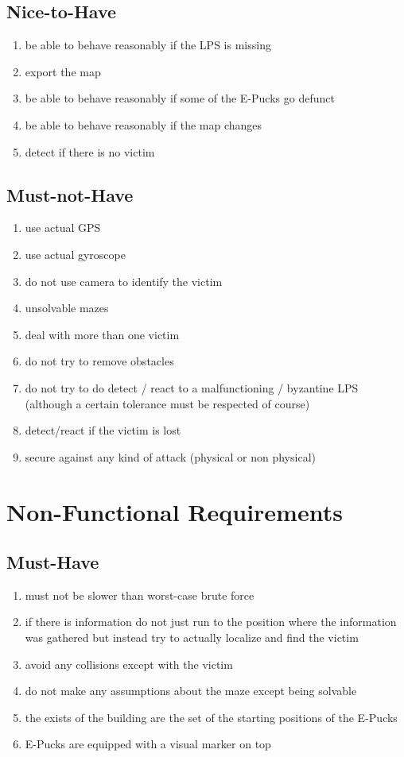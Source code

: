 \documentclass[a4paper,parskip,headheight=38pt]{scrartcl} %
\begin{document}
\subsection{Nice-to-Have}
\begin{enumerate}[label=\nicetohave]
\item be able to behave reasonably if the LPS is missing
\item export the map
\item be able to behave reasonably if some of the E-Pucks go defunct
\item be able to behave reasonably if the map changes
\item detect if there is no victim
\end{enumerate}

\subsection{Must-not-Have}
\begin{enumerate}[label=\mustnothave]
\item use actual GPS
\item use actual gyroscope
\item do not use camera to identify the victim
\item unsolvable mazes
\item deal with more than one victim
\item do not try to remove obstacles
\item do not try to do detect / react to a malfunctioning / byzantine LPS (although a certain tolerance must be respected of course)
\item detect/react if the victim is lost
\item secure against any kind of attack (physical or non physical)
\end{enumerate}

\section{Non-Functional Requirements}
\subsection{Must-Have}
\begin{enumerate}[label=\musthave]
\item must not be slower than worst-case brute force
\item if there is information do not just run to the position where the information was gathered but instead try to actually localize and find the victim
\item avoid any collisions except with the victim
\item do not make any assumptions about the maze except being solvable
\item the exists of the building are the set of the starting positions of the E-Pucks
\item E-Pucks are equipped with a visual marker on top
\end{enumerate}
\end{document}
